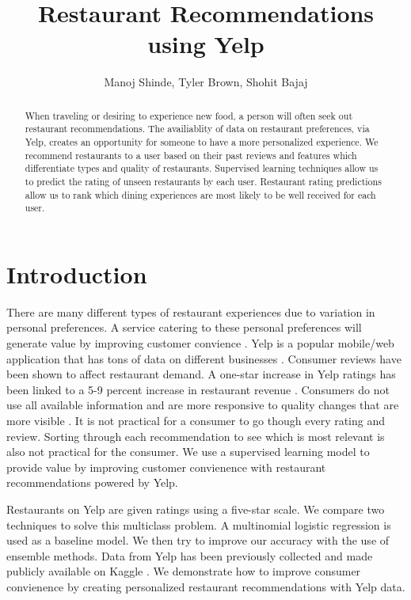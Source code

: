 \documentclass[12pt]{article}
\title{Restaurant Recommendations using Yelp}
\author{Manoj Shinde, Tyler Brown, Shohit Bajaj}
\date{ }
\begin{document}
\maketitle


\begin{abstract}
  When traveling or desiring to experience new food, a person will often seek out
  restaurant recommendations. The availiablity of data on restaurant preferences, via Yelp,
  creates an opportunity for someone to have a more personalized experience.
  We recommend restaurants to a user based on their past reviews and features which
  differentiate types and quality of restaurants. Supervised learning techniques allow
  us to predict the rating of unseen restaurants by each user. Restaurant rating
  predictions allow us to rank which dining experiences are most likely to be well
  received for each user.
  \end{abstract}

\section{Introduction}

There are many different types of restaurant experiences due to variation in
personal preferences. A service catering to these personal preferences will
generate value by improving customer convience
\cite{mackay_vandevijvere_xie_lee_swinburn_2017}. Yelp is a popular mobile/web
application that has tons of data on different businesses \cite{Restaura71:online}.
Consumer reviews have been shown to affect restaurant demand. A one-star increase in
Yelp ratings has been linked to a 5-9 percent increase in restaurant revenue
\cite{luca2016reviews}. Consumers do not use all available information and are more
responsive to quality changes that are more visible \cite{luca2016reviews}. It is
not practical for a consumer to go though every rating and review. Sorting through
each recommendation to see which is most relevant is also not practical for the
consumer. We use a supervised learning model to provide value by improving customer
convienence with restaurant recommendations powered by Yelp.

Restaurants on Yelp are given ratings using a five-star scale. We compare two
techniques to solve this multiclass problem. A multinomial logistic regression
is used as a baseline model. We then try to improve our accuracy with the use of
ensemble methods. Data from Yelp has been previously collected and made publicly
available on Kaggle \cite{YelpData59:online}. We demonstrate how to improve
consumer convienence by creating personalized restaurant recommendations with
Yelp data.
\end{document}
